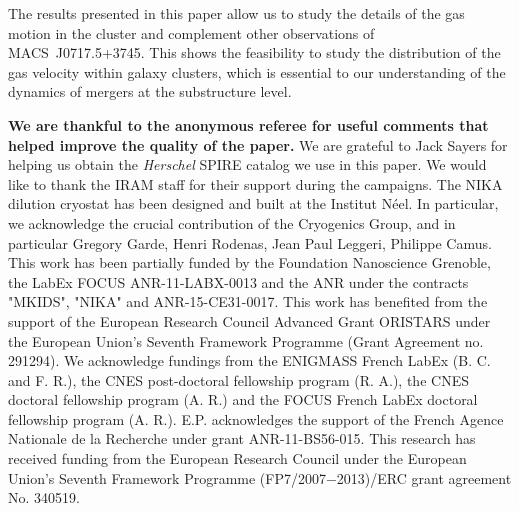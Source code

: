\documentclass[twocolumn,traditabstract]{aa}
\begin{document}
The results presented in this paper allow us to study the details of the gas motion in the cluster and complement other observations of \mbox{MACS~J0717.5+3745}. This shows the feasibility to study the distribution of the gas velocity within galaxy clusters, which is essential to our understanding of the dynamics of mergers at the substructure level.

\begin{acknowledgements}
{\bf We are thankful to the anonymous referee for useful comments that helped improve the quality of the paper.}
We are grateful to Jack Sayers for helping us obtain the \textit{Herschel} SPIRE catalog we use in this paper.
We would like to thank the IRAM staff for their support during the campaigns. 
The NIKA dilution cryostat has been designed and built at the Institut N\'eel. In particular, we acknowledge the crucial contribution of the Cryogenics Group, and in particular Gregory Garde, Henri Rodenas, Jean Paul Leggeri, Philippe Camus. 
This work has been partially funded by the Foundation Nanoscience Grenoble, the LabEx FOCUS ANR-11-LABX-0013 and the ANR under the contracts "MKIDS", "NIKA" and ANR-15-CE31-0017. 
This work has benefited from the support of the European Research Council Advanced Grant ORISTARS under the European Union's Seventh Framework Programme (Grant Agreement no. 291294).
We acknowledge fundings from the ENIGMASS French LabEx (B. C. and F. R.), the CNES post-doctoral fellowship program (R. A.), the CNES doctoral fellowship program (A. R.) and the FOCUS French LabEx doctoral fellowship program (A. R.).
E.P. acknowledges the support of the French Agence Nationale de la Recherche under grant ANR-11-BS56-015.
This research has received funding from the European Research Council under the European Union’s Seventh Framework Programme (FP7/2007−2013)/ERC grant agreement No. 340519.
\end{acknowledgements}


\end{document}
